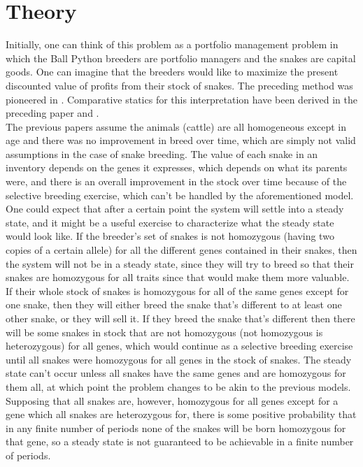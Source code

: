 \documentclass{article}
\begin{document}
	\section*{Theory}
	\indent\indent Initially, one can think of this problem as a portfolio management problem in which the Ball Python breeders are portfolio managers and the snakes are capital goods. One can imagine that the breeders would like to maximize the present discounted value of profits from their stock of snakes. The preceding method was pioneered in  \cite{jarvis}. Comparative statics for this interpretation have been derived in the preceding paper and \cite{Paarsch}.\\\indent The previous papers assume the animals (cattle) are all homogeneous except in age and there was no improvement in breed over time, which are simply not valid assumptions in the case of snake breeding. The value of each snake in an inventory depends on the genes it expresses, which depends on what its parents were, and there is an overall improvement in the stock over time because of the selective breeding exercise, which can't be handled by the aforementioned model.\\
	\indent One could expect that after a certain point the system will settle into a steady state, and it might be a useful exercise to characterize what the steady state would look like. If the breeder's set of snakes is not homozygous (having two copies of a certain allele) for all the different genes contained in their snakes, then the system will not be in a steady state, since they will try to breed so that their snakes are homozygous for all traits since that would make them more valuable. If their whole stock of snakes is homozygous for all of the same genes except for one snake, then they will either breed the snake that's different to at least one other snake, or they will sell it. If they breed the snake that's different then there will be some snakes in stock that are not homozygous (not homozygous is heterozygous) for all genes, which would continue as a selective breeding exercise until all snakes were homozygous for all genes in the stock of snakes. The steady state can't occur unless all snakes have the same genes and are homozygous for them all, at which point the problem changes to be akin to the previous models. Supposing that all snakes are, however, homozygous for all genes except for a gene which all snakes are heterozygous for, there is some positive probability that in any finite number of periods none of the snakes will be born homozygous for that gene, so a steady state is not guaranteed to be achievable in a finite number of periods.\\
\end{document}
